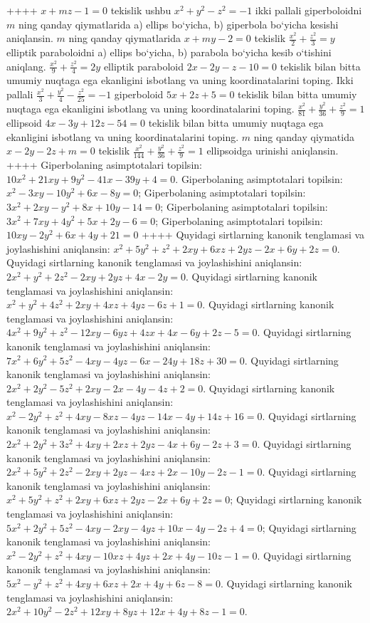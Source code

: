 ++++
$x+m z-1=0$ tekislik ushbu $x^2+y^2-z^2=-1$ ikki pallali giperboloidni $m$ ning qanday qiymatlarida a) ellips bo‘yicha, b) giperbola bo‘yicha kesishi aniqlansin.
$m$ ning qanday qiymatlarida $x+m y-2=0$ tekislik $\frac{x^2}{2}+\frac{z^2}{3}=y$ elliptik paraboloidni a) ellips bo‘yicha, b) parabola bo‘yicha kesib o‘tishini aniqlang.
$\frac{x^2}{9}+\frac{z^2}{4}=2 y$ elliptik paraboloid $2 x-2 y-z-10=0$ tekislik bilan bitta umumiy nuqtaga ega ekanligini isbotlang va uning koordinatalarini toping.
Ikki pallali $\frac{x^2}{3}+\frac{y^2}{4}-\frac{z^2}{25}=-1$ giperboloid $5 x+2 z+5=0$ tekislik bilan bitta umumiy nuqtaga ega ekanligini isbotlang va uning koordinatalarini toping.
$\frac{x^2}{81}+\frac{y^2}{36}+\frac{z^2}{9}=1$ ellipsoid $4 x-3 y+12 z-54=0$ tekislik bilan bitta umumiy nuqtaga ega ekanligini isbotlang va uning koordinatalarini toping.
$m$ ning qanday qiymatida $x-2 y-2 z+m=0$ tekislik $\frac{x^2}{144}+\frac{y^2}{36}+\frac{z^2}{9}=1$ ellipsoidga urinishi aniqlansin.
++++
Giperbolaning asimptotalari topilsin: $10 x^2+21 x y+9 y^2-41 x-39 y+4=0$.
Giperbolaning asimptotalari topilsin: $x^2-3 x y-10 y^2+6 x-8 y=0$;
Giperbolaning asimptotalari topilsin: $3 x^2+2 x y-y^2+8 x+10 y-14=0$;
Giperbolaning asimptotalari topilsin: $3 x^2+7 x y+4 y^2+5 x+2 y-6=0$;
Giperbolaning asimptotalari topilsin: $10 x y-2 y^2+6 x+4 y+21=0$
++++
Quyidagi sirtlarning kanonik tenglamasi va joylashishini aniqlansin: $x^2+5 y^2+z^2+2 x y+6 x z+2 y z-2 x+6 y+2 z=0$.
Quyidagi sirtlarning kanonik tenglamasi va joylashishini aniqlansin: $2 x^2+y^2+2 z^2-2 x y+2 y z+4 x-2 y=0$.
Quyidagi sirtlarning kanonik tenglamasi va joylashishini aniqlansin: $x^2+y^2+4 z^2+2 x y+4 x z+4 y z-6 z+1=0$.
Quyidagi sirtlarning kanonik tenglamasi va joylashishini aniqlansin: $4 x^2+9 y^2+z^2-12 x y-6 y z+4 z x+4 x-6 y+2 z-5=0$.
Quyidagi sirtlarning kanonik tenglamasi va joylashishini aniqlansin: $7 x^2+6 y^2+5 z^2-4 x y-4 y z-6 x-24 y+18 z+30=0$.
Quyidagi sirtlarning kanonik tenglamasi va joylashishini aniqlansin: $2 x^2+2 y^2-5 z^2+2 x y-2 x-4 y-4 z+2=0$.
Quyidagi sirtlarning kanonik tenglamasi va joylashishini aniqlansin: $x^2-2 y^2+z^2+4 x y-8 x z-4 y z-14 x-4 y+14 z+16=0$.
Quyidagi sirtlarning kanonik tenglamasi va joylashishini aniqlansin: $2 x^2+2 y^2+3 z^2+4 x y+2 x z+2 y z-4 x+6 y-2 z+3=0$.
Quyidagi sirtlarning kanonik tenglamasi va joylashishini aniqlansin: $2 x^2+5 y^2+2 z^2-2 x y+2 y z-4 x z+2 x-10 y-2 z-1=0$.
Quyidagi sirtlarning kanonik tenglamasi va joylashishini aniqlansin: $x^2+5 y^2+z^2+2 x y+6 x z+2 y z-2 x+6 y+2 z=0$;
Quyidagi sirtlarning kanonik tenglamasi va joylashishini aniqlansin: $5 x^2+2 y^2+5 z^2-4 x y-2 x y-4 y z+10 x-4 y-2 z+4=0$;
Quyidagi sirtlarning kanonik tenglamasi va joylashishini aniqlansin: $x^2-2 y^2+z^2+4 x y-10 x z+4 y z+2 x+4 y-10 z-1=0$.
Quyidagi sirtlarning kanonik tenglamasi va joylashishini aniqlansin: $5 x^2-y^2+z^2+4 x y+6 x z+2 x+4 y+6 z-8=0$.
Quyidagi sirtlarning kanonik tenglamasi va joylashishini aniqlansin: $2 x^2+10 y^2-2 z^2+12 x y+8 y z+12 x+4 y+8 z-1=0$.